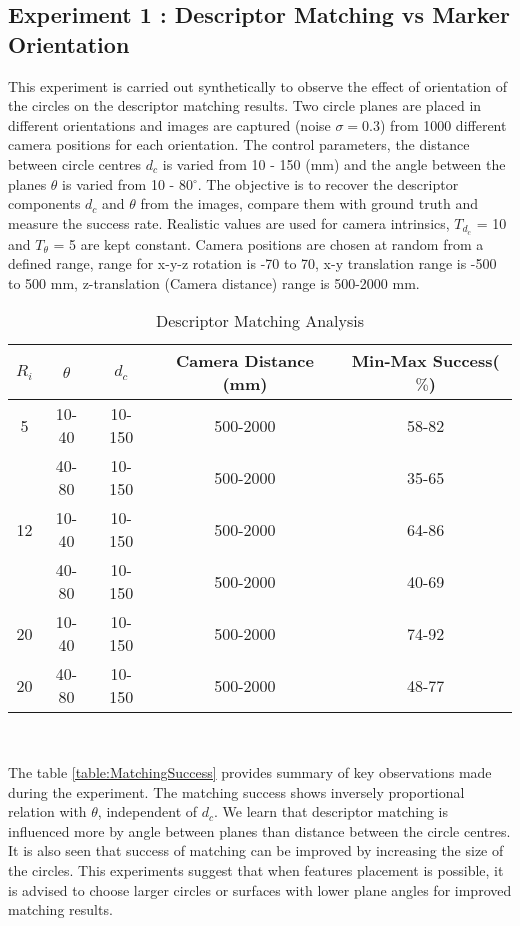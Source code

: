\documentclass{bmvc2k}
\begin{document}
\subsection{Experiment 1 : Descriptor Matching vs Marker Orientation}
This experiment is carried out synthetically to observe the effect of orientation of the circles on the descriptor matching results.
Two circle planes are placed in different orientations and images are captured (noise $ \sigma = 0.3 $) from 1000 different camera positions for each orientation. 
The control parameters, the distance between circle centres $ d_c $ is varied from 10 - 150 (mm) and the angle between the planes $ \theta $ is varied from 10 - 80$ ^\circ $. 
The objective is to recover the descriptor components $ d_c $ and $ \theta $ from the images, compare them with ground truth and measure the success rate. 
Realistic values are used for camera intrinsics, $ T_{d_c} $ = 10 and $ T_\theta $ = 5 are kept constant. 
Camera positions are chosen at random from a defined range, range for x-y-z rotation is -70 to 70, x-y translation range is -500 to 500 mm, z-translation (Camera distance) range is 500-2000 mm. 

\begin{table}
\centering
\caption{Descriptor Matching Analysis } \label{table:MatchingSuccess}
\begin{tabular}{|c | c | c | c | c |}
\hline
$ R_i $ & $ \theta $ & $ d_c $ & Camera Distance (mm) & Min-Max Success($ \% $) \\ \hline
5 & 10-40 & 10-150 & 500-2000 & 58-82 \\
 & 40-80 & 10-150 & 500-2000 & 35-65 \\ \hline
12 & 10-40 & 10-150 & 500-2000 & 64-86 \\
& 40-80 & 10-150& 500-2000 & 40-69 \\ \hline
 20 & 10-40 & 10-150 & 500-2000 & 74-92 \\
 20 & 40-80 & 10-150 & 500-2000  & 48-77 \\ \hline 
\end{tabular} \\
\label{tab:Exp1}
\end{table}
The table \ref{table:MatchingSuccess} provides summary of key observations made during the experiment. 
The matching success shows inversely proportional relation with $ \theta $, independent of $ d_c $. 
We learn that descriptor matching is influenced more by angle between planes than distance between the circle centres. 
It is also seen that success of matching can be improved by increasing the size of the circles. 
This experiments suggest that when features placement is possible, it is advised to choose larger circles or surfaces with lower plane angles for improved matching results. 
\end{document}
